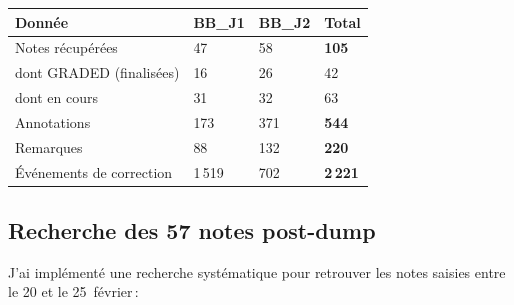 \documentclass[11pt,a4paper]{article}
\begin{document}
\begin{center}
	\renewcommand{\arraystretch}{1.35}
	\begin{tabular}{lC{2cm}|C{2cm}|C{2cm}|}
		\toprule
		\textbf{\sffamily Donn\'{e}e}      & \textbf{\sffamily BB\_J1} & \textbf{\sffamily BB\_J2} & \textbf{\sffamily Total} \\
		\midrule
		Notes r\'{e}cup\'{e}r\'{e}es       & 47                        & 58                        & \textbf{105}             \\
		\midrule
		\quad dont GRADED (finalis\'{e}es) & 16                        & 26                        & 42                       \\
		\midrule
		\quad dont en cours                & 31                        & 32                        & 63                       \\
		\midrule
		Annotations                        & 173                       & 371                       & \textbf{544}             \\
		\midrule
		Remarques                          & 88                        & 132                       & \textbf{220}             \\
		\midrule
		\'{E}v\'{e}nements de correction   & 1\,519                    & 702                       & \textbf{2\,221}          \\
		\bottomrule
	\end{tabular}
\end{center}

\subsection{Recherche des 57 notes post-dump}

J'ai impl\'{e}ment\'{e} une recherche syst\'{e}matique pour retrouver les notes saisies entre le 20 et le 25~f\'{e}vrier\,:
\end{document}
